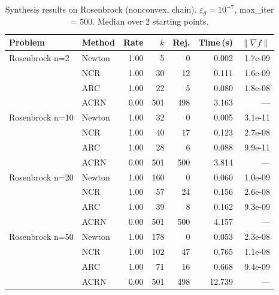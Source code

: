 \begin{table}[ht]
  \centering
  \caption{Synthesis results on Rosenbrock (nonconvex, chain). $\varepsilon_g = 10^{-7}$, max\_iter = 500. Median over 2 starting points.}
  \label{tab:synth_rosenbrock}
  \begin{tabular}{|l|l|r|r|r|r|r|}
    \hline
    \textbf{Problem} & \textbf{Method} & \textbf{Rate} & \textbf{$k$} & \textbf{Rej.} & \textbf{Time\,(s)} & \textbf{$\|\nabla f\|$} \\
    \hline\hline
    Rosenbrock n=2 & Newton & 1.00 & 5 & 0 & 0.002 & 1.7e-09 \\
     & NCR & 1.00 & 30 & 12 & 0.111 & 1.6e-09 \\
     & ARC & 1.00 & 22 & 5 & 0.080 & 1.8e-08 \\
     & ACRN & 0.00 & 501 & 498 & 3.163 & --- \\
    \hline
    Rosenbrock n=10 & Newton & 1.00 & 32 & 0 & 0.005 & 3.1e-11 \\
     & NCR & 1.00 & 40 & 17 & 0.123 & 2.7e-08 \\
     & ARC & 1.00 & 28 & 6 & 0.088 & 9.9e-11 \\
     & ACRN & 0.00 & 501 & 500 & 3.814 & --- \\
    \hline
    Rosenbrock n=20 & Newton & 1.00 & 160 & 0 & 0.060 & 1.0e-09 \\
     & NCR & 1.00 & 57 & 24 & 0.156 & 2.6e-08 \\
     & ARC & 1.00 & 39 & 8 & 0.162 & 9.3e-09 \\
     & ACRN & 0.00 & 501 & 500 & 4.157 & --- \\
    \hline
    Rosenbrock n=50 & Newton & 1.00 & 178 & 0 & 0.053 & 2.3e-08 \\
     & NCR & 1.00 & 102 & 47 & 0.765 & 1.1e-08 \\
     & ARC & 1.00 & 71 & 16 & 0.668 & 9.4e-09 \\
     & ACRN & 0.00 & 501 & 498 & 12.739 & --- \\
    \hline
  \end{tabular}
\end{table}